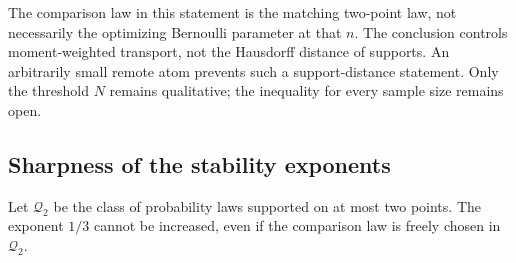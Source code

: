 \documentclass[11pt,a4paper]{article}
\numberwithin{equation}{section}
\theoremstyle{definition}
\theoremstyle{remark}
\begin{document}
The comparison law in this statement is the matching two-point law,
not necessarily the optimizing Bernoulli parameter at that $n$.
The conclusion controls moment-weighted transport, not the Hausdorff
distance of supports. An arbitrarily small remote atom prevents such
a support-distance statement. Only the threshold $N$ remains qualitative;
the inequality for every sample size remains open.

\subsection{Sharpness of the stability exponents}

Let $\mathcal Q_2$ be the class of probability laws supported on at most
two points. The exponent $1/3$ cannot be increased, even if the comparison
law is freely chosen in $\mathcal Q_2$.
\end{document}
